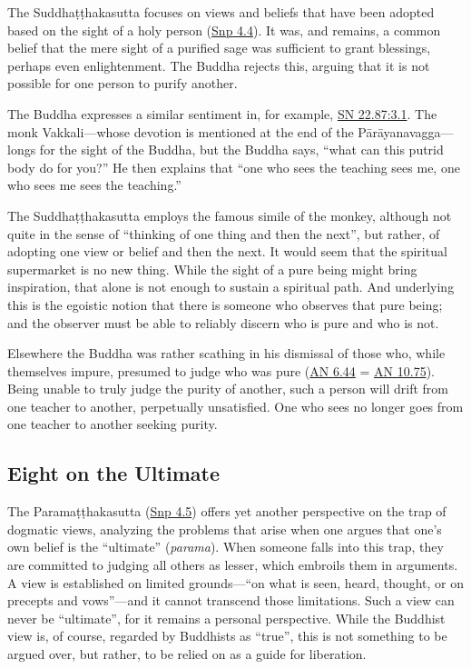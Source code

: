 \documentclass[12pt,openany]{book}%
\begin{document}
The \textsanskrit{Suddhaṭṭhakasutta} focuses on views and beliefs that have been adopted based on the sight of a holy person (\href{https://suttacentral.net/snp4.4/en/sujato}{Snp 4.4}). It was, and remains, a common belief that the mere sight of a purified sage was sufficient to grant blessings, perhaps even enlightenment. The Buddha rejects this, arguing that it is not possible for one person to purify another.

The Buddha expresses a similar sentiment in, for example, \href{https://suttacentral.net/sn22.87/en/sujato\#3.1}{SN 22.87:3.1}. The monk Vakkali—whose devotion is mentioned at the end of the \textsanskrit{Pārāyanavagga}—longs for the sight of the Buddha, but the Buddha says, “what can this putrid body do for you?” He then explains that “one who sees the teaching sees me, one who sees me sees the teaching.”

The \textsanskrit{Suddhaṭṭhakasutta} employs the famous simile of the monkey, although not quite in the sense of “thinking of one thing and then the next”, but rather, of adopting one view or belief and then the next. It would seem that the spiritual supermarket is no new thing. While the sight of a pure being might bring inspiration, that alone is not enough to sustain a spiritual path. And underlying this is the egoistic notion that there is someone who observes that pure being; and the observer must be able to reliably discern who is pure and who is not.

Elsewhere the Buddha was rather scathing in his dismissal of those who, while themselves impure, presumed to judge who was pure (\href{https://suttacentral.net/an6.44/en/sujato}{AN 6.44} = \href{https://suttacentral.net/an10.75/en/sujato}{AN 10.75}). Being unable to truly judge the purity of another, such a person will drift from one teacher to another, perpetually unsatisfied. One who sees no longer goes from one teacher to another seeking purity.

\subsection*{Eight on the Ultimate}

The \textsanskrit{Paramaṭṭhakasutta} (\href{https://suttacentral.net/snp4.5/en/sujato}{Snp 4.5}) offers yet another perspective on the trap of dogmatic views, analyzing the problems that arise when one argues that one’s own belief is the “ultimate” (\textit{parama}). When someone falls into this trap, they are committed to judging all others as lesser, which embroils them in arguments. A view is established on limited grounds—“on what is seen, heard, thought, or on precepts and vows”—and it cannot transcend those limitations. Such a view can never be “ultimate”, for it remains a personal perspective. While the Buddhist view is, of course, regarded by Buddhists as “true”, this is not something to be argued over, but rather, to be relied on as a guide for liberation.
\end{document}
